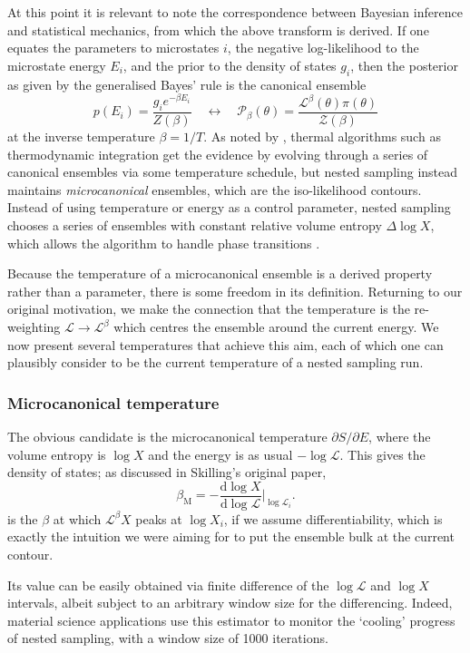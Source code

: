 \documentclass[usenatbib]{mnras}
\newcommand{\Like}{\mathcal{L}}
\begin{document}
At this point it is relevant to note the correspondence between Bayesian inference and statistical mechanics, from which the above transform is derived. If one equates the parameters to microstates $i$, the negative log-likelihood to the microstate energy $E_i$, and the prior to the density of states $g_i$, then the posterior as given by the generalised Bayes' rule is the canonical ensemble
\begin{equation}
    p(E_i) = \frac{g_i e^{-\beta E_i}}{Z(\beta)} \quad \leftrightarrow \quad \mathcal{P}_\beta(\theta) = \frac{\mathcal{L}^{\beta}(\theta)\pi(\theta)}{\mathcal{Z}(\beta)}
\end{equation}
at the inverse temperature $\beta = 1/T$. As noted by \citet{demons}, thermal algorithms such as thermodynamic integration \citep{path_sampling} get the evidence by evolving through a series of canonical ensembles via some temperature schedule, but nested sampling instead maintains \textit{microcanonical} ensembles, which are the iso-likelihood contours. Instead of using temperature \citep{simulated_annealing, parallel_tempering} or energy \citep{wang_landau} as a control parameter, nested sampling chooses a series of ensembles with constant relative volume entropy $\Delta \log X$, which allows the algorithm to handle phase transitions \citep{baldock}.
\par
Because the temperature of a microcanonical ensemble is a derived property rather than a parameter, there is some freedom in its definition. Returning to our original motivation, we make the connection that the temperature is the re-weighting $\Like \to \Like^{\beta}$ which centres the ensemble around the current energy. We now present several temperatures that achieve this aim, each of which one can plausibly consider to be the current temperature of a nested sampling run.

\subsubsection{Microcanonical temperature}\label{sec:microcanonical_temperature}
The obvious candidate is the microcanonical temperature $\partial S/\partial E$, where the volume entropy is $\log X$ and the energy is as usual $-\log \Like$. This gives the density of states; as discussed in Skilling's original paper,
\begin{equation}
    \beta_\mathrm{M}  = - \frac{\mathrm{d} \log X}{\mathrm{d} \log \Like} \Bigg\vert_{\log \Like_i}.
\end{equation}
is the $\beta$ at which $\Like^{\beta} X$ peaks at $\log X_i$, if we assume differentiability, which is exactly the intuition we were aiming for to put the ensemble bulk at the current contour. 
\par
Its value can be easily obtained via finite difference of the $\log \Like$ and $\log X$ intervals, albeit subject to an arbitrary window size for the differencing. Indeed, material science applications \citep{Baldock_2017} use this estimator to monitor the `cooling' progress of nested sampling, with a window size of 1000 iterations.
\end{document}
